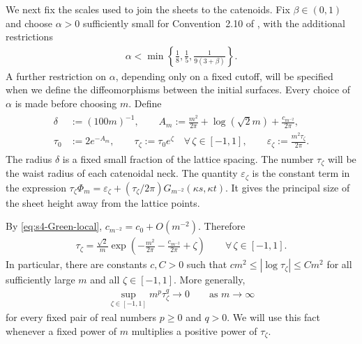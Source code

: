 \documentclass[a4paper,11pt,oneside,reqno]{amsart}
\numberwithin{equation}{section}
\theoremstyle{definition}
\begin{document}
We next fix the scales used to join the sheets to the
catenoids. Fix $\beta\in(0,1)$ and choose $\alpha>0$
sufficiently small for Convention~2.10 of
\cite{KapouleasMcGrathLD}, with the additional restrictions
%
\begin{align}
    \label{eq:s4-alpha}
    \alpha<\min\left\{\frac18,\frac15,
    \frac1{9(3+\beta)}\right\}.
\end{align}
%
A further restriction on $\alpha$, depending only on a
fixed cutoff, will be specified when we define the
diffeomorphisms between the initial surfaces. Every choice
of $\alpha$ is made before choosing $m$.
Define
%
\begin{align}
    \label{eq:s4-scales}
    \begin{split}
        \delta&:=(100m)^{-1},\qquad
        A_m:=\frac{m^2}{2\pi}+\log(\sqrt2m)
            +\frac{c_{m^{-2}}}{2\pi},\\
        \tau_0&:=2e^{-A_m},\qquad
        \tau_\zeta:=\tau_0e^\zeta
            \quad\forall\,\zeta\in[-1,1],\qquad
        \varepsilon_\zeta:=\frac{m^2\tau_\zeta}{2\pi}.
    \end{split}
\end{align}
%
The radius $\delta$ is a fixed small fraction of the
lattice spacing. The number $\tau_\zeta$ will be the
waist radius of each catenoidal neck. The quantity
$\varepsilon_\zeta$ is the constant term in the expression
$\tau_\zeta\Phi_m=\varepsilon_\zeta+
(\tau_\zeta/2\pi)G_{m^{-2}}(\kappa s,\kappa t)$.
It gives the principal size of the sheet height away
from the lattice points.

By \eqref{eq:s4-Green-local},
$c_{m^{-2}}=c_0+O(m^{-2})$. Therefore
%
\begin{align*}
    \tau_\zeta
    =\frac{\sqrt2}{m}
    \exp\left(-\frac{m^2}{2\pi}
        -\frac{c_{m^{-2}}}{2\pi}+\zeta\right)
    \qquad\forall\,\zeta\in[-1,1].
\end{align*}
%
In particular, there are constants $c,C>0$ such that
$cm^2\leq|\log\tau_\zeta|\leq Cm^2$ for all sufficiently
large $m$ and all $\zeta\in[-1,1]$. More generally,
%
\begin{align*}
    \sup_{\zeta\in[-1,1]}m^p\tau_\zeta^q\rightarrow0
    \qquad\text{as }m\to\infty
\end{align*}
%
for every fixed pair of real numbers $p\geq0$ and $q>0$.
We will use this fact whenever a fixed power of $m$
multiplies a positive power of $\tau_\zeta$.
\end{document}
